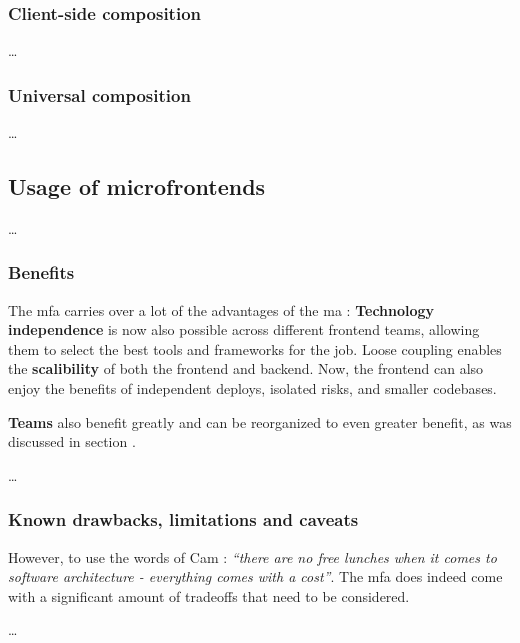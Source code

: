 \subsubsection{Client-side composition}
\dots %
\subsubsection{Universal composition}
\label{sssec:universal-composition}
\dots %

\subsection{Usage of microfrontends}
\dots %

\subsubsection{Benefits}

The \gls{mfa} carries over a lot of the advantages of the \gls{ma}
\autocite{Jackson_2019}: \textbf{Technology independence} is now also possible
across different \gls{frontend} teams, allowing them to select the best tools
and frameworks for the job. Loose coupling enables the \textbf{scalibility} of
both the \gls{frontend} and \gls{backend}. Now, the \gls{frontend} can also
enjoy the benefits of independent deploys, isolated risks, and smaller
codebases.

\textbf{Teams} also benefit greatly and can be reorganized to even greater
benefit, as was discussed in section .

\dots %

\subsubsection{Known drawbacks, limitations and caveats}

However, to use the words of Cam \textcite{Jackson_2019}: \textit{``there are no
free lunches when it comes to software architecture - everything comes with a
cost''}. The \gls{mfa} does indeed come with a significant amount of tradeoffs
that need to be considered. 

\dots %